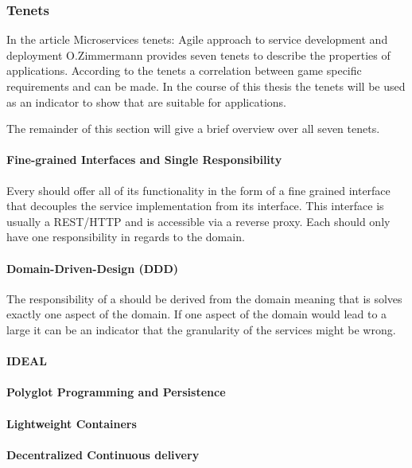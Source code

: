 \subsubsection{\ms{} Tenets}

In the article Microservices tenets: Agile approach to service development and
deployment O.Zimmermann provides seven \ms{} tenets to describe the properties
of \ms{} applications. According to the tenets a correlation between game
specific requirements and \ogs{} can be made. In the course of this thesis the
\ms{} tenets will be used as an indicator to show that \mss{} are suitable for
\og{} applications.

The remainder of this section will give a brief overview over all seven tenets.

\paragraph{Fine-grained Interfaces and Single Responsibility}

Every \ms{} should offer all of its functionality in the form of a fine grained
interface that decouples the service implementation from its interface. This
interface is usually a REST/HTTP and is accessible via a reverse proxy. Each
\ms{} should only have one responsibility in regards to the domain.

\paragraph{Domain-Driven-Design (DDD)}

The responsibility of a \ms{} should be derived from the domain meaning that is
solves exactly one aspect of the domain. If one aspect of the domain would lead
to a large \ms{} it can be an indicator that the granularity of the services
might be wrong.

\paragraph{IDEAL}
\paragraph{Polyglot Programming and Persistence}
\paragraph{Lightweight Containers}
\paragraph{Decentralized Continuous delivery}
